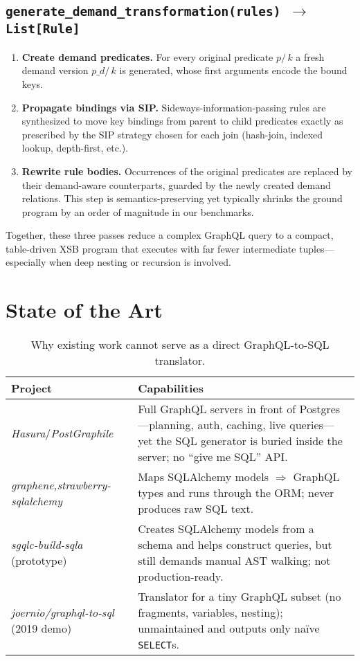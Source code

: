 \documentclass[11pt]{article}
\begin{document}
\subsection{\texttt{generate\_demand\_transformation(rules) $\rightarrow$ List\texttt{[}Rule\texttt{]}}}
\begin{enumerate}[label=\arabic*., leftmargin=1.6em]
  \item \textbf{Create demand predicates.}  
        For every original predicate \(p/\,k\) a fresh demand version
        \(p\_d/\,k\) is generated, whose first arguments encode the bound
        keys.
  \item \textbf{Propagate bindings via SIP.}  
        Sideways-information-passing rules are synthesized to move key
        bindings from parent to child predicates exactly as prescribed by
        the SIP strategy chosen for each join (hash-join, indexed
        lookup, depth-first, etc.).
  \item \textbf{Rewrite rule bodies.}  
        Occurrences of the original predicates are replaced by their
        demand-aware counterparts, guarded by the newly created demand
        relations.  This step is semantics-preserving \cite{DemandTransform}
        yet typically shrinks the ground program by an order of
        magnitude in our benchmarks.
\end{enumerate}

Together, these three passes reduce a complex GraphQL query to a compact,
table-driven XSB program that executes with far fewer intermediate
tuples—especially when deep nesting or recursion is involved.


\section{State of the Art}
\begin{table}[h]
\centering
\renewcommand{\arraystretch}{1.2}
\begin{tabularx}{\textwidth}{@{}lX@{}}
\toprule
\textbf{Project} & \textbf{Capabilities} \\
\midrule
\emph{Hasura}/\emph{PostGraphile} &
Full GraphQL servers in front of Postgres—planning, auth, caching, live queries—yet the SQL generator is buried inside the server; no “give me SQL” API. \\ \addlinespace
\emph{{graphene,strawberry}-sqlalchemy} &
Maps SQLAlchemy models $\Rightarrow$ GraphQL types and runs through the ORM; never produces raw SQL text. \\ \addlinespace
\emph{sgqlc-build-sqla} (prototype) &
Creates SQLAlchemy models from a schema and helps construct queries, but still demands manual AST walking; not production-ready. \\ \addlinespace
\emph{joernio/graphql-to-sql} (2019 demo) &
Translator for a tiny GraphQL subset (no fragments, variables, nesting); unmaintained and outputs only naïve \texttt{SELECT}s. \\
\bottomrule
\end{tabularx}
\caption{Why existing work cannot serve as a direct GraphQL-to-SQL translator.}
\end{table}
\end{document}
